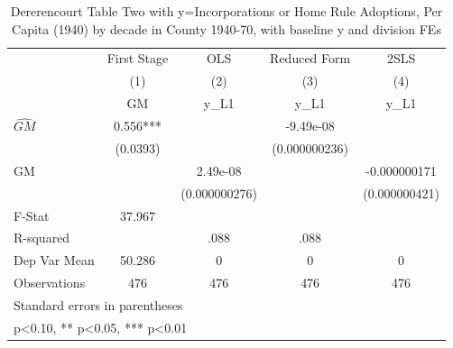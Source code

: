 \begin{table}[htbp]\centering
\def\sym#1{\ifmmode^{#1}\else\(^{#1}\)\fi}
\caption{Dererencourt Table Two with y=Incorporations or Home Rule Adoptions, Per Capita (1940) by decade in County 1940-70, with baseline y and division FEs}
\begin{tabular}{l*{4}{c}}
\toprule
                    & First Stage   &         OLS   &Reduced Form   &        2SLS   \\
                    &\multicolumn{1}{c}{(1)}&\multicolumn{1}{c}{(2)}&\multicolumn{1}{c}{(3)}&\multicolumn{1}{c}{(4)}\\
                    &\multicolumn{1}{c}{GM}&\multicolumn{1}{c}{y\_L1}&\multicolumn{1}{c}{y\_L1}&\multicolumn{1}{c}{y\_L1}\\
\midrule
$\hat{GM}$          &       0.556***&               &   -9.49e-08   &               \\
                    &    (0.0393)   &               &(0.000000236)   &               \\
\addlinespace
GM                  &               &    2.49e-08   &               &-0.000000171   \\
                    &               &(0.000000276)   &               &(0.000000421)   \\
\midrule
F-Stat              &      37.967   &               &               &               \\
R-squared           &               &        .088   &        .088   &               \\
Dep Var Mean        &      50.286   &           0   &           0   &           0   \\
Observations        &         476   &         476   &         476   &         476   \\
\bottomrule
\multicolumn{5}{l}{\footnotesize Standard errors in parentheses}\\
\multicolumn{5}{l}{\footnotesize * p<0.10, ** p<0.05, *** p<0.01}\\
\end{tabular}
\end{table}
